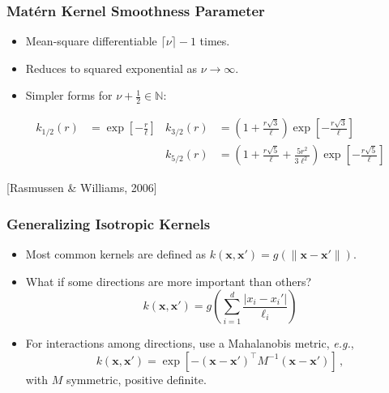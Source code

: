 \documentclass{beamer}
\newcommand{\N}{\mathbb{N}}
\newcommand{\vect}[1]{\boldsymbol{#1}}
\providecommand{\norm}[1]{\lVert#1\rVert}
\newcommand{\citeAY}[1]{
	\begin{flushright}
		{\footnotesize [#1]}
	\end{flushright}
}
\begin{document}
	\begin{frame}
		\frametitle{Mat\'{e}rn Kernel Smoothness Parameter}
		\begin{itemize}
			\item Mean-square differentiable $\lceil\nu\rceil-1$ times.
			\item Reduces to squared exponential as $\nu\to\infty$.
			\item Simpler forms for $\nu+\tfrac{1}{2}\in\N$:
		\end{itemize}
		\begin{align*}
			{k_{1/2}(r)} & =\exp\left[-\frac{r}{\ell}\right] & k_{3/2}(r) & =\left(1+\frac{r\sqrt{3}}{\ell}\right)\exp\left[-\frac{r\sqrt{3}}{\ell}\right]\\
			& & k_{5/2}(r) & =\left(1+\frac{r\sqrt{5}}{\ell}+\frac{5r^2}{3\ell^2}\right)\exp\left[-\frac{r\sqrt{5}}{\ell}\right]
		\end{align*}
		\citeAY{Rasmussen \& Williams, 2006}
	\end{frame}

	\begin{frame}
		\frametitle{Generalizing Isotropic Kernels}
		\begin{itemize}
			\item Most common kernels are defined as $k(\vect{x},\vect{x}')=g(\norm{\vect{x}-\vect{x}'})$.
			\item What if some directions are more important than others?
			\begin{equation*}
				k(\vect{x},\vect{x}')=g\left(\sum_{i=1}^d\frac{|x_i-x_i'|}{\ell_i}\right)
			\end{equation*}
			\item For interactions among directions, use a Mahalanobis metric, \emph{e.g.},
			\begin{equation*}
				k(\vect{x},\vect{x}')=\exp\left[-(\vect{x}-\vect{x}')^\top M^{-1}(\vect{x}-\vect{x}')\right]\,,
			\end{equation*}
			with $M$ symmetric, positive definite.
		\end{itemize}
	\end{frame}
	
\end{document}
